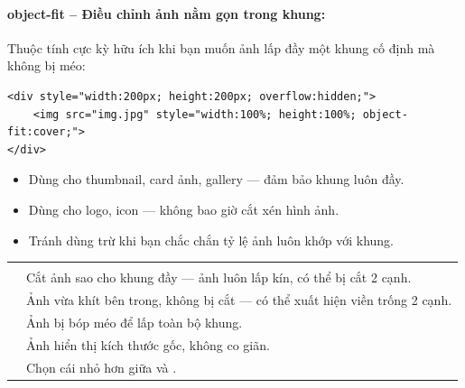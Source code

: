 \paragraph{object-fit – Điều chỉnh ảnh nằm gọn trong khung:}

Thuộc tính  cực kỳ hữu ích khi bạn muốn ảnh lấp đầy một khung cố định mà không bị méo:

\begin{codeWindow}
\begin{lstlisting}[language=HTML5]
<div style="width:200px; height:200px; overflow:hidden;">
    <img src="img.jpg" style="width:100%; height:100%; object-fit:cover;">
</div>
\end{lstlisting}
\end{codeWindow}

\begin{tipBox}
\begin{itemize}[leftmargin=1.5em, itemsep=2pt, parsep=0pt]
    \item Dùng  cho thumbnail, card ảnh, gallery — đảm bảo khung luôn đầy.
    \item Dùng  cho logo, icon — không bao giờ cắt xén hình ảnh.
    \item Tránh dùng  trừ khi bạn chắc chắn tỷ lệ ảnh luôn khớp với khung.
\end{itemize}
\end{tipBox}

\begin{prettyTableBox}
\begin{tabularx}{\linewidth}{C{2.5cm} Z}
 &  \\
 & Cắt ảnh sao cho khung đầy — ảnh luôn lấp kín, có thể bị cắt 2 cạnh. \\
 & Ảnh vừa khít bên trong, không bị cắt — có thể xuất hiện viền trống 2 cạnh. \\
 & Ảnh bị bóp méo để lấp toàn bộ khung. \\
 & Ảnh hiển thị kích thước gốc, không co giãn. \\
 & Chọn cái nhỏ hơn giữa  và . \\
\end{tabularx}
\end{prettyTableBox}

